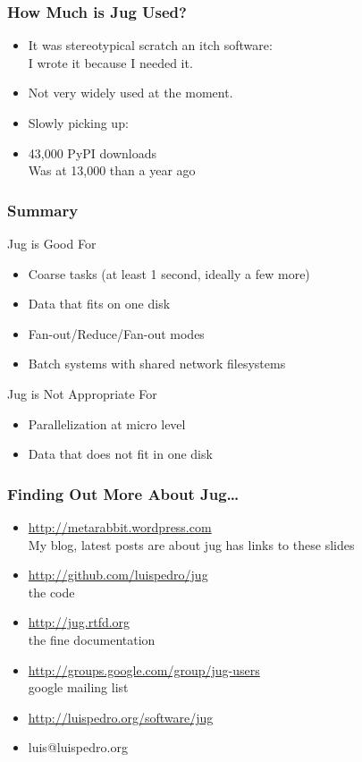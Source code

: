 \documentclass{beamer}
\begin{document}
\begin{frame}[fragile]
\frametitle{How Much is Jug Used?}

\begin{itemize}
\item It was stereotypical \alert{scratch an itch} software:\\
    I wrote it because I needed it.
\item Not very widely used at the moment.
\item Slowly picking up:
\item 43,000 PyPI downloads\\
    \alert{Was at 13,000 than a year ago}
\end{itemize}

\end{frame}

\begin{frame}[fragile]
\frametitle{Summary}
\begin{block}{Jug is Good For}
\begin{itemize}
\item Coarse tasks (at least 1 second, ideally a few more)
\item Data that fits on one disk
\item Fan-out/Reduce/Fan-out modes
\item Batch systems with shared network filesystems
\end{itemize}
\end{block}

\begin{block}{Jug is Not Appropriate For}
\begin{itemize}
\item Parallelization at micro level
\item Data that does not fit in one disk
\end{itemize}
\end{block}
\end{frame}

\begin{frame}[fragile]
\frametitle{Finding Out More About Jug\ldots}
\begin{itemize}
\item \url{http://metarabbit.wordpress.com}\\My blog, latest posts are about jug \alert{has links to these slides}
\item \url{http://github.com/luispedro/jug}\\the code
\item \url{http://jug.rtfd.org}\\the fine documentation
\item \url{http://groups.google.com/group/jug-users}\\google mailing list
\item \url{http://luispedro.org/software/jug}
\item luis@luispedro.org
\end{itemize}

\end{frame}
\end{document}

